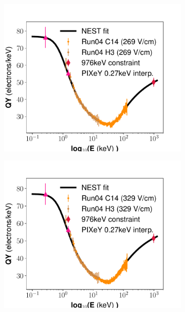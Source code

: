 \begin{figure}[h!]
\begin{subfigure}{0.5\textwidth}
  \centering
  \includegraphics[width=\textwidth]{Figures/Yields_fit_old/NEST_fit_269Vcm_old.pdf}
  \caption{}
\end{subfigure}%
\begin{subfigure}{0.5\textwidth}
  \centering
  \includegraphics[width=\textwidth]{Figures/Yields_fit_old/NEST_fit_329Vcm_old.pdf}
  \caption{}
\end{subfigure}
\begin{subfigure}{0.5\textwidth}

\end{subfigure}
\end{figure}
